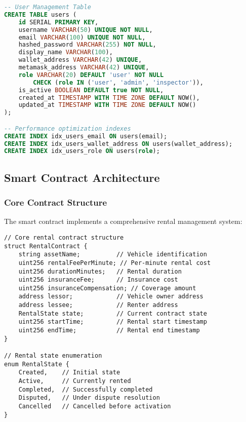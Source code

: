 \documentclass[12pt,a4paper]{article}
\begin{document}
\begin{lstlisting}[language=SQL, caption=User Management Table]
-- User Management Table
CREATE TABLE users (
    id SERIAL PRIMARY KEY,
    username VARCHAR(50) UNIQUE NOT NULL,
    email VARCHAR(100) UNIQUE NOT NULL,
    hashed_password VARCHAR(255) NOT NULL,
    display_name VARCHAR(100),
    wallet_address VARCHAR(42) UNIQUE,
    metamask_address VARCHAR(42) UNIQUE,
    role VARCHAR(20) DEFAULT 'user' NOT NULL 
        CHECK (role IN ('user', 'admin', 'inspector')),
    is_active BOOLEAN DEFAULT true NOT NULL,
    created_at TIMESTAMP WITH TIME ZONE DEFAULT NOW(),
    updated_at TIMESTAMP WITH TIME ZONE DEFAULT NOW()
);

-- Performance optimization indexes
CREATE INDEX idx_users_email ON users(email);
CREATE INDEX idx_users_wallet_address ON users(wallet_address);
CREATE INDEX idx_users_role ON users(role);
\end{lstlisting}

\subsection{Smart Contract Architecture}

\subsubsection{Core Contract Structure}
The smart contract implements a comprehensive rental management system:

\begin{lstlisting}[language=Solidity, caption=Rental Contract Structure]
// Core rental contract structure
struct RentalContract {
    string assetName;          // Vehicle identification
    uint256 rentalFeePerMinute; // Per-minute rental cost
    uint256 durationMinutes;   // Rental duration
    uint256 insuranceFee;      // Insurance cost
    uint256 insuranceCompensation; // Coverage amount
    address lessor;            // Vehicle owner address
    address lessee;            // Renter address
    RentalState state;         // Current contract state
    uint256 startTime;         // Rental start timestamp
    uint256 endTime;           // Rental end timestamp
}

// Rental state enumeration
enum RentalState {
    Created,    // Initial state
    Active,     // Currently rented
    Completed,  // Successfully completed
    Disputed,   // Under dispute resolution
    Cancelled   // Cancelled before activation
}
\end{lstlisting}
\end{document}
